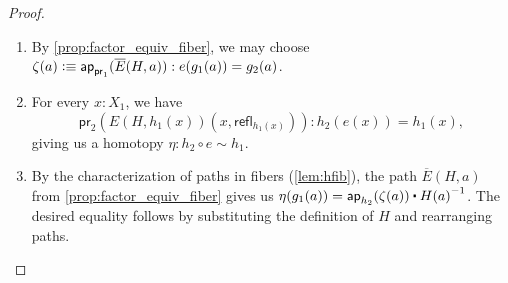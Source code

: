 \documentclass[10pt,a4paper]{article}
\newcommand{\defeq}{\vcentcolon\equiv}  %
\newcommand{\proj}[1]{\ensuremath{\mathsf{pr}_{#1}}\xspace}
\newcommand{\refl}[1]{\ensuremath{\mathsf{refl}_{#1}}\xspace}
\newcommand{\ct}{%
  \mathchoice{\mathbin{\raisebox{0.5ex}{$\displaystyle\centerdot$}}}%
             {\mathbin{\raisebox{0.5ex}{$\centerdot$}}}%
             {\mathbin{\raisebox{0.25ex}{$\scriptstyle\,\centerdot\,$}}}%
             {\mathbin{\raisebox{0.1ex}{$\scriptscriptstyle\,\centerdot\,$}}}
}
\newcommand{\opp}[1]{\mathord{{#1}^{-1}}}
\newcommand{\mapfunc}[1]{\ensuremath{\mathsf{ap}_{#1}}\xspace} %
\let\apfunc\mapfunc
\newcommand{\htpy}{\sim}
\theoremstyle{definition}
\theoremstyle{remark}
\numberwithin{equation}{section}
\begin{document}
\begin{proof}
\begin{enumerate}
\item By \cref{prop:factor_equiv_fiber}, we may choose
  $\zeta(a) \defeq \apfunc{\proj1}(\overline E(H,a)) : e(g_1(a)) = g_2(a)$.
  \label{item:orth-fact-2}
\item For every $x:X_1$, we have
\begin{equation*}
\proj2(E(H,h_1(x))({x,\refl{h_1(x)}})) :h_2(e(x))= h_1(x),
\end{equation*}
giving us a homotopy $\eta:h_2\circ e\htpy h_1$.
\item By the characterization of paths in fibers (\cref{lem:hfib}), the path $\overline E(H,a)$ from \cref{prop:factor_equiv_fiber} gives us
  $\eta(g_1(a)) = \apfunc{h_2}(\zeta(a)) \ct \opp{H(a)}$.
  The desired equality follows by substituting the definition of $H$ and rearranging paths.\qedhere
\end{enumerate}
\end{proof}



\end{document}
